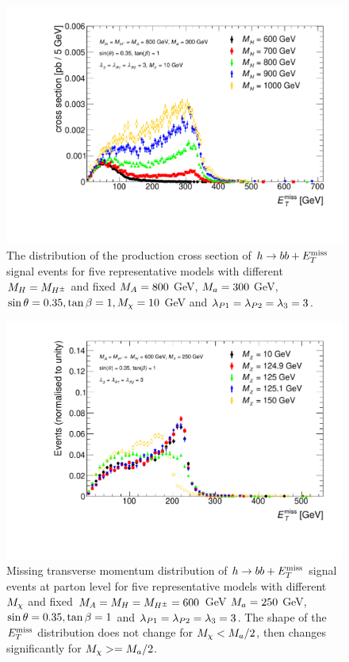 \begin{figure}[tbp]
\centering
\includegraphics[width=\textwidth]{texinputs/04_grid/figures/monoHbb_mH_scan_MET_liny.pdf}
\caption[$\MET$ distribution in  $h\rightarrow bb + \MET$ events for different $\mH$]
{The \MET distribution of the production cross section of $h\rightarrow bb + \MET$ signal events for five representative models with different $M_{H} = M_{H^{\pm}}$ 
and fixed $ M_{A}=800$ GeV, $M_{a} = 300 $ GeV,  $ \sin\theta = 0.35, \tan\beta = 1, M_{\chi} = 10$ GeV and $ \lambda_{P1} = \lambda_{P2} = \lambda_{3} = 3 $. 
%
}
\label{fig:monoHbb_mH_scan_met}
\end{figure}
\begin{figure}[tbp]
\centering
\includegraphics[width=\textwidth]{texinputs/04_grid/figures/monoHbb_mDM_scan_MET_liny_norm2one.pdf}
\caption[$\MET$ distribution in $h\rightarrow bb + \MET$ events for different $\mDM$]
{
Missing transverse momentum distribution  of $h\rightarrow bb + \MET$ signal events at parton level for five representative models with different $\mDM$
and fixed $M_{A} = M_{H} = M_{H^{\pm}} = 600 $ GeV $M_{a} = 250$ GeV, $ \sin\theta = 0.35, \tan\beta = 1$ and $ \lambda_{P1} = \lambda_{P2} = \lambda_{3} = 3 $. 
The shape of the $\MET$ distribution does not change for $M_{\chi} < M_{a}/2$, then changes significantly for $M_{\chi}>=M_{a}/2$.
%
}
\label{fig:monoHbb_mDM_scan_met}
\end{figure}
